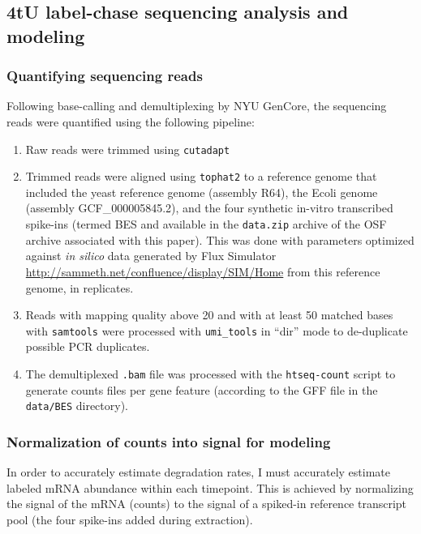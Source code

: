 \subsection{4tU label-chase sequencing analysis and modeling}

\subsubsection{Quantifying sequencing reads}

Following base-calling and demultiplexing by NYU GenCore, the sequencing
reads were quantified using the following pipeline:

\begin{enumerate}
  \setlength\itemsep{0em}
  \item Raw reads were trimmed using \texttt{cutadapt} \parencite{martin2011cutadapt}
  \item Trimmed reads were aligned using \texttt{tophat2} \parencite{kim2013tophat2}
    to a reference genome that included the yeast reference 
     genome (assembly R64), the Ecoli genome (assembly 
     GCF\_000005845.2), and the four synthetic in-vitro transcribed 
     spike-ins (termed BES and available in the \texttt{data.zip} 
     archive of the OSF archive associated with this paper). 
     This was done with parameters optimized 
     against \emph{in silico} data generated by Flux Simulator
     \url{http://sammeth.net/confluence/display/SIM/Home} from this 
     reference genome, in replicates.
  \item Reads with mapping quality above 20 and with at least 50 
    matched bases with 
    \texttt{samtools} \parencite{li2009sequence}
    were processed with \texttt{umi\_tools} \parencite{smith2017umi}
    in ``dir'' mode to
    de-duplicate possible PCR duplicates.
  \item The demultiplexed \texttt{.bam} file was processed with the
    \texttt{htseq-count} \parencite{anders2015htseq}
    script to generate counts files per gene feature (according to 
    the GFF file in the \texttt{data/BES} directory).
\end{enumerate}

\subsubsection{Normalization of counts into signal for modeling}

\label{subsec:4tuNormalization}

In order to accurately estimate degradation rates, I must accurately
estimate labeled mRNA abundance within each timepoint. This is
achieved by normalizing the signal of the mRNA (counts) to the signal
of a spiked-in reference transcript pool (the four spike-ins added
during extraction).

